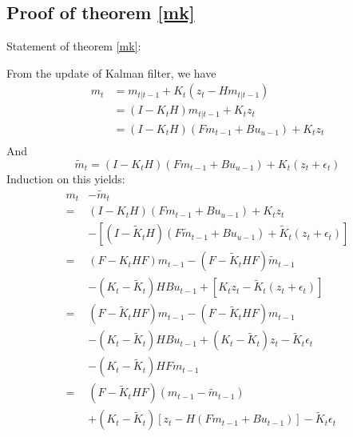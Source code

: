 \documentclass[letterpaper, 10 pt, conference]{ieeeconf}  %
\begin{document}
\subsection{Proof of theorem \ref{mk}}
Statement of theorem \ref{mk}: 


\proof From the update of Kalman filter, we have
\begin{equation}
\begin{split}
\label{Proposition1}
 m_t& = m_{t|t-1} + K_t(z_t-Hm_{t|t-1})\\
&=(I-K_tH)m_{t|t-1} +K_t z_t\\
&=(I- K_tH) (Fm_{t-1}
+Bu_{u-1}) +K_t z_t
\\
\end{split}
\end{equation}
And
$$\tilde{m}_t = (I- K_tH) (Fm_{t-1} +Bu_{u-1}) +K_t (z_t + \epsilon_t)$$
Induction on this yields:
\begin{equation}
\begin{split}
\label{Proposition2}
m_t & - \tilde{m}_t \\
=& (I- K_tH) (Fm_{t-1} +Bu_{u-1}) +K_t z_t \\
&- [(I- \tilde{K}_tH) (F\tilde{m}_{t-1} +Bu_{u-1}) +\tilde{K}_t (z_t+\epsilon_t)]\\
=& (F - K_t H F)m_{t-1} - (F- \tilde{K}_t H F)\tilde{m}_{t-1}\\
&-(K_t - \tilde{K}_t)HBu_{t-1} + [K_t z_t - \tilde{K}_t(z_t+ \epsilon_t)]\\
=& (F - \tilde{K}_tHF)m_{t-1} - (F- \tilde{K}_tHF)m_{t-1}\\
&- (K_t - \tilde{K}_t) H Bu_{t-1} +(K_t - \tilde{K}_t)z_t - \tilde{K}_t \epsilon_t\\
&-(K_t - \tilde{K}_t) HFm_{t-1}\\
=&(F - \tilde{K}_t HF)(m_{t-1} - \tilde{m}_{t-1})\\
&+(K_t - \tilde{K}_t)[z_t - H (Fm_{t-1} + Bu_{t-1})] -\tilde{K}_t \epsilon_t
\end{split}
\end{equation}
\end{document}
